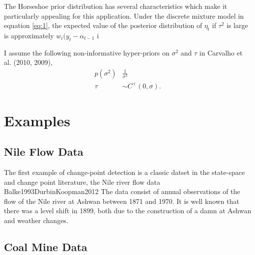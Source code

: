 \documentclass{article}
\begin{document}
The Horseshoe prior distribution has several characteristics which make it particularly appealing for this application.
Under the discrete mixture model in equation \eqref{eq:1}, the expected value of the posterior distribution of $\eta_{t}$ if $\tau^{2}$ is large is approximately $w_{i} (y_{t} - \alpha_{t-1}$ i
\begin{equation}
  \label{eq:18}
\end{equation}

I assume the following non-informative hyper-priors on $\sigma^{2}$ and $\tau$ in Carvalho et al. (2010, 2009),
\begin{align}
  \label{eq:9}
  p(\sigma^{2}) & \frac{1}{\sigma^{2}}  \\
  \label{eq:11}
  \tau &\sim C^{+}(0, \sigma) \text{.}
\end{align}

\section{Examples}
\label{sec:examples}

\subsection{Nile Flow Data}
\label{sec:nile}

The first example of change-point detection is a classic datset in the state-space and change point literature, the Nile river flow data \textcite{Cobb1978}{Balke1993}{DurbinKoopman2012}
The data consist of annual observations of the flow of the Nile river at Ashwan between 1871 and 1970. 
It is well known that there was a level shift in 1899, both due to the construction of a damn at Ashwan and weather changes.

\subsection{Coal Mine Data}
\label{sec:coal-mine-data}



\printbibliography{}
\end{document}
